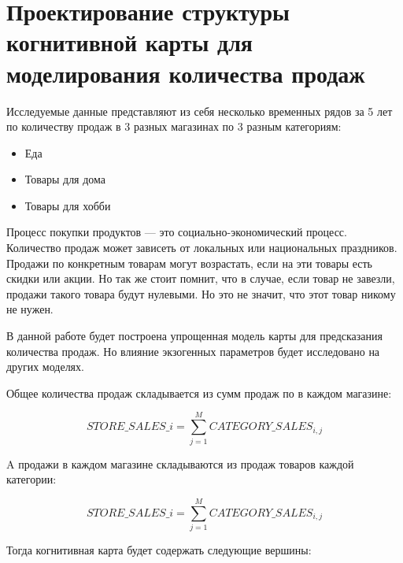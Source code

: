 \section{Проектирование структуры когнитивной карты для моделирования количества продаж}

Исследуемые данные представляют из себя несколько временных рядов
за 5 лет по количеству продаж в 3 разных магазинах по 3 разным категориям:

\begin{itemize}
	\item Еда
	\item Товары для дома
	\item Товары для хобби
\end{itemize}

Процесс покупки продуктов --- это социально-экономический процесс.
Количество продаж может зависеть от локальных или национальных праздников.
Продажи по конкретным товарам могут возрастать, если на эти товары есть скидки или акции.
Но так же стоит помнит, что в случае, если товар не завезли,
продажи такого товара будут нулевыми. Но это не значит, что этот товар никому не нужен.

В данной работе будет построена упрощенная модель карты для предсказания количества продаж.
Но влияние экзогенных параметров будет исследовано на других моделях.

Общее количества продаж складывается из сумм продаж
по в каждом магазине:

\begin{equation}\label{eq:sales_total_simple_model}
	STORE\_SALES\_{i} = \sum_{j=1}^{M} CATEGORY\_SALES_{i,j}
\end{equation}

\noindent A продажи в каждом магазине складываются из продаж
товаров каждой категории:

\begin{equation}\label{eq:store_sales_simple_model}
	STORE\_SALES\_{i} = \sum_{j=1}^{M} CATEGORY\_SALES_{i,j}
\end{equation}

Тогда когнитивная карта будет содержать следующие вершины:

